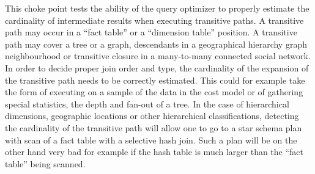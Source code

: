 
This choke point tests the ability of the query optimizer to properly estimate
the cardinality of intermediate results when executing transitive paths. A
transitive path may occur in a ``fact table'' or a ``dimension table'' position.
A transitive path may cover a tree or a graph, \eg descendants in a geographical
hierarchy \vs graph neighbourhood or transitive closure in a many-to-many
connected social network. In order to decide proper join order and type, the
cardinality of the expansion of the transitive path needs to be correctly
estimated. This could for example take the form of executing on a sample of the
data in the cost model or of gathering special statistics, \eg the depth and
fan-out of a tree. In the case of hierarchical dimensions, \eg geographic
locations or other hierarchical classifications, detecting the cardinality of
the transitive path will allow one to go to a star schema plan with scan of a
fact table with a selective hash join. Such a plan will be on the other hand
very bad for example if the hash table is much larger than the ``fact table''
being scanned.


